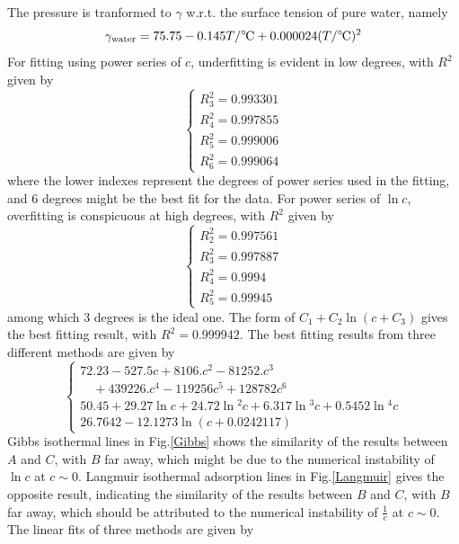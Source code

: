 \documentclass[%
 reprint,
 amsmath,amssymb,
 aps,
10.5pt,
]{revtex4-1}
\newcommand{\celsius}{\ensuremath{^\circ\hspace{-0.09em}\mathrm{C}}}
\begin{document}
The pressure is tranformed to $\gamma$ w.r.t. the surface tension of pure water, namely
\begin{equation}
\gamma_\text{water} = 75.75 - 0.145 T/\celsius + 0.000024 (T/\celsius)^2
\end{equation}
For fitting using power series of $c$, underfitting is evident in low degrees, with $R^2$ given by
\begin{equation*}
\begin{cases}
R_3^2 =0.993301 \\
R_4^2	= 0.997855 	\\
R_5^2		= 0.999006 	\\
R_6^2		= 0.999064
\end{cases}
\end{equation*}
where the lower indexes represent the degrees of power series used in the fitting, and 6 degrees might be the best fit for the data. For power series of $\ln{c}$, overfitting is conspicuous at high degrees, with $R^2$ given by
\begin{equation*}
\begin{cases}
R_2^2 =0.997561 \\
R_3^2	= 0.997887 \\
R_4^2		= 0.9994 \\
R_5^2		= 0.99945
\end{cases}
\end{equation*}
among which 3 degrees is the ideal one. The form of $C_1+C_2\ln{(c + C_3)}$ gives the best fitting result, with $R^2 = 0.999942$. The best fitting results from three different methods are given by
\begin{equation*}
\begin{cases}
72.23 - 527.5 c + 8106. c^2 - 81252. c^3 \\
\quad+ 439226. c^4 - 119256 c^5 + 128782 c^6\\
  50.45 + 29.27 \ln{c} + 24.72 \ln{^2c} + 6.317 \ln{^3c} + 0.5452 \ln{^4c} \\
  26.7642 - 12.1273 \ln{(c+ 0.0242117 )}
  \end{cases}
\end{equation*}
Gibbs isothermal lines in Fig.\ref{Gibbs} shows the similarity of the results between $A$ and $C$, with $B$ far away, which might be due to the numerical instability of $\ln{c}$ at $c\sim0$. Langmuir isothermal adsorption lines in Fig.\ref{Langmuir} gives the opposite result, indicating the similarity of the results between $B$ and $C$, with $B$ far away, which should be attributed to the numerical instability of $\frac{1}{c}$ at $c\sim0$. The linear fits of three methods are given by
\end{document}

